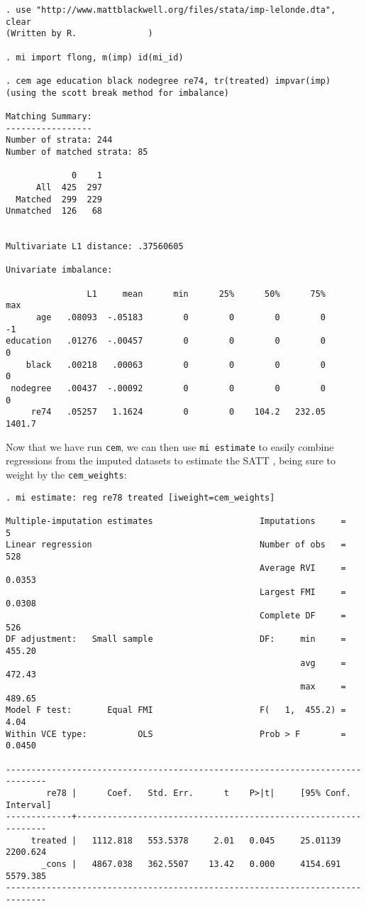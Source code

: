\documentclass[11pt,titlepage]{article}
\begin{document}
\begin{verbatim}
. use "http://www.mattblackwell.org/files/stata/imp-lelonde.dta", clear
(Written by R.              )

. mi import flong, m(imp) id(mi_id)

. cem age education black nodegree re74, tr(treated) impvar(imp)
(using the scott break method for imbalance)

Matching Summary:
-----------------
Number of strata: 244
Number of matched strata: 85

             0    1
      All  425  297
  Matched  299  229
Unmatched  126   68


Multivariate L1 distance: .37560605

Univariate imbalance:

                L1     mean      min      25%      50%      75%      max
      age   .08093  -.05183        0        0        0        0       -1
education   .01276  -.00457        0        0        0        0        0
    black   .00218   .00063        0        0        0        0        0
 nodegree   .00437  -.00092        0        0        0        0        0
     re74   .05257   1.1624        0        0    104.2   232.05   1401.7
\end{verbatim}
Now that we have run \texttt{cem}, we can then use \texttt{mi
  estimate} to easily combine regressions from the imputed datasets to
estimate the SATT \citep{KinHonJos01}, being sure to weight by the
\texttt{cem\_weights}:
\begin{verbatim}
. mi estimate: reg re78 treated [iweight=cem_weights]

Multiple-imputation estimates                     Imputations     =          5
Linear regression                                 Number of obs   =        528
                                                  Average RVI     =     0.0353
                                                  Largest FMI     =     0.0308
                                                  Complete DF     =        526
DF adjustment:   Small sample                     DF:     min     =     455.20
                                                          avg     =     472.43
                                                          max     =     489.65
Model F test:       Equal FMI                     F(   1,  455.2) =       4.04
Within VCE type:          OLS                     Prob > F        =     0.0450

------------------------------------------------------------------------------
        re78 |      Coef.   Std. Err.      t    P>|t|     [95% Conf. Interval]
-------------+----------------------------------------------------------------
     treated |   1112.818   553.5378     2.01   0.045     25.01139    2200.624
       _cons |   4867.038   362.5507    13.42   0.000     4154.691    5579.385
------------------------------------------------------------------------------

\end{verbatim}
\end{document}
